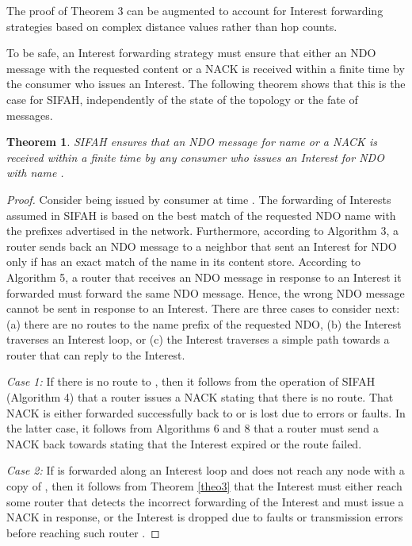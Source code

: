 \documentclass{ancs15-alternate}
\newtheorem{theorem}{Theorem}
\begin{document}
The proof of Theorem 3 can be augmented to account for Interest forwarding strategies based on complex distance values rather than hop counts.

To be safe, an Interest forwarding strategy must ensure that either an NDO message with the requested content or a NACK is received within a finite time by the consumer who issues an Interest. The following theorem shows that this is the case for SIFAH, independently of the state of the topology or the fate of messages.


\begin{theorem}
\label{theo4}
SIFAH ensures that an NDO message for name   or a NACK  is received within a finite time by any consumer who issues an Interest for NDO with name .
\end{theorem}

\begin{proof}
Consider  
 being issued by consumer  at time . 
The forwarding of Interests assumed in SIFAH is based on the best match of the requested NDO name with the prefixes advertised in the network. Furthermore, according to Algorithm 3, a router sends back an NDO message to a neighbor that sent an Interest for NDO  only if has an exact match of the name  in its content store. According to Algorithm 5, a router that receives an NDO message in response to an Interest it forwarded must forward the same NDO message. Hence, the wrong NDO message cannot be sent in response to an Interest.
There are three cases to consider next: (a) there are no routes to the name prefix  of the requested NDO, (b) the Interest  traverses an Interest loop, or (c) the Interest traverses a simple path towards a router  that can reply to the Interest. 

{\em Case 1:} If there is no route to , then it follows from the operation of SIFAH (Algorithm 4) that a router issues a NACK stating that there is no route. That NACK is either forwarded successfully back to  or is lost due to errors or faults. In the latter case, it follows from Algorithms 6 and 8 that a router must send a NACK back towards  stating that the Interest expired or the route failed. 

{\em Case 2:}  If   is forwarded along an Interest loop and does not reach any node with a copy of , then it follows from  Theorem \ref{theo3} that the Interest must either reach some router  that detects the incorrect forwarding of the Interest and must issue a NACK  in response, or the Interest is dropped due to faults or transmission errors before reaching such router .


\end{proof}
\end{document}
